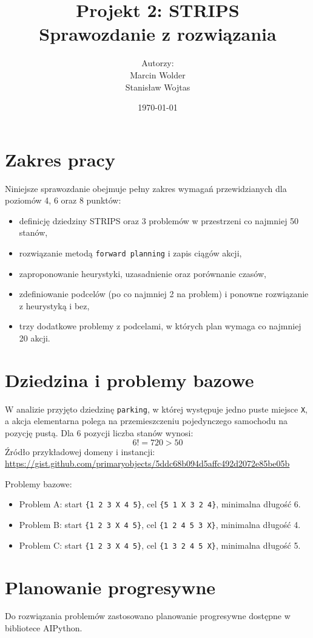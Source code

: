 \documentclass[12pt,a4paper]{article}
\title{Projekt 2: STRIPS\\Sprawozdanie z rozwiązania}
\author{
Autorzy:\\[0.5em]
Marcin Wolder\\
Stanisław Wojtas\\
}
\date{\today}
\begin{document}
\maketitle

\newpage

\section{Zakres pracy}
Niniejsze sprawozdanie obejmuje pełny zakres wymagań przewidzianych dla poziomów 4, 6 oraz 8 punktów:
\begin{itemize}
    \item definicję dziedziny STRIPS oraz 3 problemów w przestrzeni co najmniej 50 stanów,
    \item rozwiązanie metodą \texttt{forward planning} i zapis ciągów akcji,
    \item zaproponowanie heurystyki, uzasadnienie oraz porównanie czasów,
    \item zdefiniowanie podcelów (po co najmniej 2 na problem) i ponowne rozwiązanie z heurystyką i bez,
    \item trzy dodatkowe problemy z podcelami, w których plan wymaga co najmniej 20 akcji.
\end{itemize}

\section{Dziedzina i problemy bazowe}
W analizie przyjęto dziedzinę \texttt{parking}, w której występuje jedno puste miejsce \texttt{X}, a akcja elementarna polega na przemieszczeniu pojedynczego samochodu na pozycję pustą.
Dla 6 pozycji liczba stanów wynosi:
\[
6! = 720 > 50
\]
Źródło przykładowej domeny i instancji: 
\url{https://gist.github.com/primaryobjects/5ddc68b094d5affc492d2072e85be05b}

Problemy bazowe:
\begin{itemize}
    \item Problem A: start \texttt{\{1 2 3 X 4 5\}}, cel \texttt{\{5 1 X 3 2 4\}}, minimalna długość 6.
    \item Problem B: start \texttt{\{1 2 3 X 4 5\}}, cel \texttt{\{1 2 4 5 3 X\}}, minimalna długość 4.
    \item Problem C: start \texttt{\{1 2 3 X 4 5\}}, cel \texttt{\{1 3 2 4 5 X\}}, minimalna długość 5.
\end{itemize}

\section{Planowanie progresywne}
Do rozwiązania problemów zastosowano planowanie progresywne dostępne w bibliotece AIPython.
\end{document}
